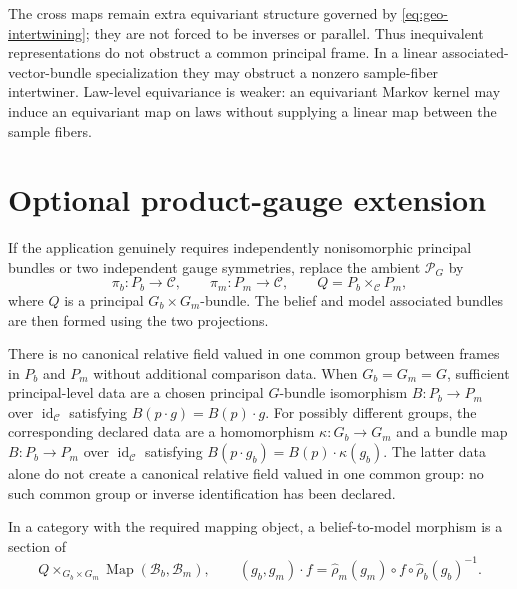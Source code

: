 The cross maps remain extra equivariant structure governed by
\eqref{eq:geo-intertwining}; they are not forced to be inverses or parallel.  Thus
inequivalent representations do not obstruct a common principal frame.  In a linear
associated-vector-bundle specialization they may obstruct a nonzero sample-fiber intertwiner.
Law-level equivariance is weaker: an equivariant Markov kernel may induce an equivariant map on
laws without supplying a linear map between the sample fibers.

\section{Optional product-gauge extension}
\label{sec:geo-product-extension}

If the application genuinely requires independently nonisomorphic principal bundles or two
independent gauge symmetries, replace the ambient $\mathscr P_G$ by
\begin{equation}
\pi_b:P_b\to\mathcal C,
\qquad
\pi_m:P_m\to\mathcal C,
\qquad
Q=P_b\times_{\mathcal C}P_m,
\label{eq:geo-product-principal-extension}
\end{equation}
where $Q$ is a principal $G_b\times G_m$-bundle.  The belief and model associated bundles are then
formed using the two projections. 

There is no canonical relative field valued in one common group between frames in
$P_b$ and $P_m$ without additional comparison data.  When $G_b=G_m=G$, sufficient principal-level
data are a chosen principal $G$-bundle isomorphism
$B:P_b\to P_m$ over $\operatorname{id}_{\mathcal C}$ satisfying
$B(p\cdot g)=B(p)\cdot g$.  For possibly different groups, the corresponding declared data are a
homomorphism $\kappa:G_b\to G_m$ and a bundle map $B:P_b\to P_m$ over
$\operatorname{id}_{\mathcal C}$ satisfying
$B(p\cdot g_b)=B(p)\cdot\kappa(g_b)$.  The latter data alone do not create a canonical relative
field valued in one common group: no such common group or inverse identification has been declared.

In a category with the required mapping object, a belief-to-model morphism is a section of
\begin{equation}
Q\times_{G_b\times G_m}\operatorname{Map}(\mathcal B_b,\mathcal B_m),
\qquad
(g_b,g_m)\cdot f
=\widehat\rho_m(g_m)\circ f\circ\widehat\rho_b(g_b)^{-1}.
\label{eq:geo-product-cross-map-bundle}
\end{equation}

